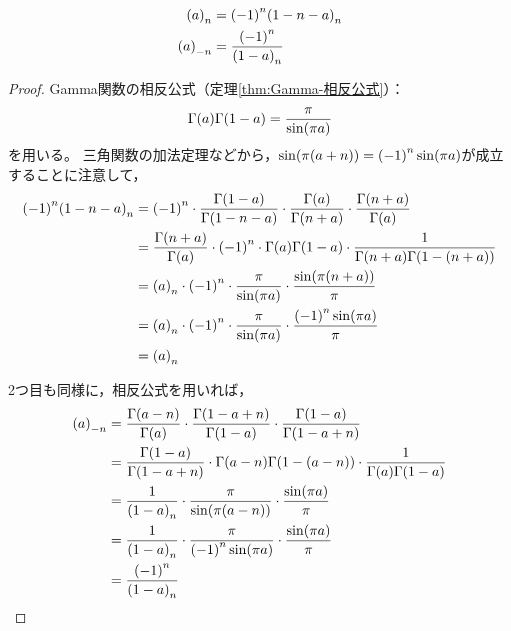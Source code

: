 \documentclass[a4paper,draft]{ltjsarticle}
\begin{document}
\begin{prop}
    \begin{align}
        \poch{a}{n}&=\pare{-1}^n\poch{1-n-a}{n}
        \\
        \poch{a}{-n}&=\dfrac{\pare{-1}^n}{\poch{1-a}{n}} \label{eq:Poch-poch{a}{-n}}
    \end{align}
    \begin{proof}
        Gamma関数の相反公式（定理\ref{thm:Gamma-相反公式}）：
        \begin{equation}
            \fun{\Gamma}{a}\fun{\Gamma}{1-a}=\frac{\pi}{\fun{\sin}{\pi a}}    
        \end{equation}
        を用いる。
        三角関数の加法定理などから，$\fun{\sin}{\pi\pare{a+n}}=\pare{-1}^n\fun{\sin}{\pi a}$が成立することに注意して，
        \begin{align}
            \pare{-1}^n\poch{1-n-a}{n}
            &=\pare{-1}^n\cdot\frac{\fun{\Gamma}{1-a}}{\fun{\Gamma}{1-n-a}}\cdot \frac{\fun{\Gamma}{a}}{\fun{\Gamma}{n+a}}\cdot\frac{\fun{\Gamma}{n+a}}{\fun{\Gamma}{a}}
            \\
            &=\frac{\fun{\Gamma}{n+a}}{\fun{\Gamma}{a}}\cdot \pare{-1}^n \cdot \fun{\Gamma}{a}\fun{\Gamma}{1-a}\cdot\frac{1}{\fun{\Gamma}{n+a}\fun{\Gamma}{1-\spare{n+a}}}
            \\
            &=\poch{a}{n}\cdot\pare{-1}^n\cdot \frac{\pi}{\fun{\sin}{\pi a}}\cdot\frac{\fun{\sin}{\pi\pare{n+a}}}{\pi}
            \\
            &=\poch{a}{n}\cdot\pare{-1}^n\cdot \frac{\pi}{\fun{\sin}{\pi a}}\cdot\frac{\pare{-1}^n\fun{\sin}{\pi a}}{\pi}
            \\
            &=\poch{a}{n}
        \end{align}

        2つ目も同様に，相反公式を用いれば，
        \begin{align}
            \poch{a}{-n}&=\frac{\fun{\Gamma}{a-n}}{\fun{\Gamma}{a}}\cdot\frac{\fun{\Gamma}{1-a+n}}{\fun{\Gamma}{1-a}}\cdot\frac{\fun{\Gamma}{1-a}}{\fun{\Gamma}{1-a+n}}
            \\
            &=\frac{\fun{\Gamma}{1-a}}{\fun{\Gamma}{1-a+n}}
            \cdot \fun{\Gamma}{a-n}\fun{\Gamma}{1-\spare{a-n}}
            \cdot\frac{1}{\fun{\Gamma}{a}\fun{\Gamma}{1-a}}
            \\
            &=\frac{1}{\poch{1-a}{n}}
            \cdot \frac{\pi}{\fun{\sin}{\pi\pare{a-n}}}\cdot \frac{\fun{\sin}{\pi a}}{\pi}
            \\
            &=\frac{1}{\poch{1-a}{n}}\cdot \frac{\pi}{\pare{-1}^n\fun{\sin}{\pi a}}\cdot \frac{\fun{\sin}{\pi a}}{\pi}
            \\
            &=\frac{\pare{-1}^n}{\poch{1-a}{n}}
        \end{align}
    \end{proof}
\end{prop}
\end{document}
